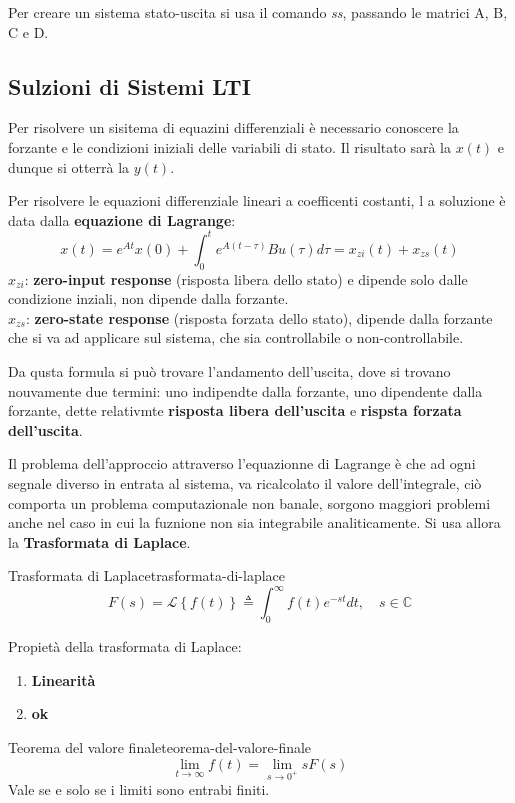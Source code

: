 \documentclass[12pt]{article}
\begin{document}
Per creare un sistema stato-uscita si usa il comando \emph{ss}, passando le matrici A, B, C e D.

\subsection{Sulzioni di Sistemi LTI}
Per risolvere un sisitema di equazini differenziali \`e necessario conoscere la forzante e le condizioni iniziali delle variabili di stato. Il risultato sar\`a la $x(t)$ e dunque si otterr\`a la $y(t)$.

Per risolvere le equazioni differenziale lineari a coefficenti costanti, l a soluzione \`e data dalla \textbf{equazione di Lagrange}:
\[ x(t) = e^{At} x(0) + \int_0^t e^{A(t-\tau)}Bu(\tau)d\tau = x_{zi}(t) + x_{zs}(t) \]
$x_{zi}$: \textbf{zero-input response} (risposta libera dello stato)  e dipende solo dalle condizione inziali, non dipende dalla forzante. \\
$x_{zs}$: \textbf{zero-state response} (risposta forzata dello stato), dipende dalla forzante che si va ad applicare sul sistema, che sia controllabile o non-controllabile.

Da qusta formula si pu\`o trovare l'andamento dell'uscita, dove si trovano nouvamente due termini: uno indipendte dalla forzante, uno dipendente dalla forzante, dette relativmte \textbf{risposta libera dell'uscita} e \textbf{rispsta forzata dell'uscita}.

Il problema dell'approccio attraverso l'equazionne di Lagrange \`e che ad ogni segnale diverso in entrata al sistema, va ricalcolato il valore dell'integrale, ci\`o comporta un problema computazionale non banale, sorgono maggiori problemi anche nel caso in cui la fuznione non sia integrabile analiticamente. Si usa allora la \textbf{Trasformata di Laplace}.

\begin{definition}{Trasformata di Laplace}{trasformata-di-laplace}
    \[ F(s) = \mathcal{L} \left\{f(t)\right\} \triangleq \int_0^\infty f(t)e^{-st} dt,\quad s \in \mathbb{C} \]
\end{definition}

Propiet\`a della trasformata di Laplace:
\begin{enumerate}
    \item {\bf Linearit\`a}
    \item {\bf ok}
\end{enumerate}

\begin{theorem}{Teorema del valore finale}{teorema-del-valore-finale}
    \[ \lim_{t \to \infty} f(t) = \lim_{s \to 0^+} sF(s) \]
    Vale se e solo se i limiti sono entrabi finiti.
\end{theorem}
\end{document}
